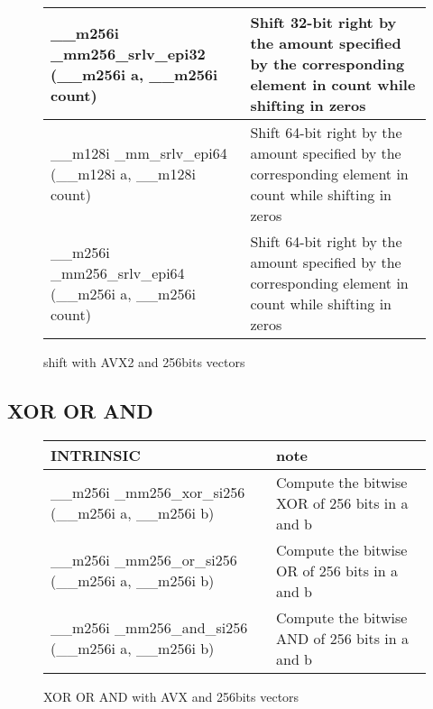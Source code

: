 \documentclass{article}
\begin{document}
\begin{figure}[h!]
\begin{tabular}{|l|l|}
\hline
\_\_m256i \_mm256\_srlv\_epi32 (\_\_m256i a, \_\_m256i count) & Shift 32-bit right by the amount specified by the corresponding element in count while shifting in zeros \\
\hline
\_\_m128i \_mm\_srlv\_epi64 (\_\_m128i a, \_\_m128i count) & Shift 64-bit right by the amount specified by the corresponding element in count while shifting in zeros\\
\hline
\_\_m256i \_mm256\_srlv\_epi64 (\_\_m256i a, \_\_m256i count) & Shift 64-bit right by the amount specified by the corresponding element in count while shifting in zeros \\
\hline
\end{tabular}
\caption{shift with AVX2 and 256bits vectors}
\label{fig:shift AVX2 256bits instructions}
\end{figure}

\newpage
\subsection{XOR OR AND}
\vspace{1cm}
\begin{figure}[h!]
\noindent
\noindent\begin{tabular}{|l|l|}
  \hline
  INTRINSIC & note \\
  \hline
  \_\_m256i \_mm256\_xor\_si256 (\_\_m256i a, \_\_m256i b) & Compute the bitwise XOR of 256 bits in a and b \\
  \_\_m256i \_mm256\_or\_si256 (\_\_m256i a, \_\_m256i b) & Compute the bitwise OR of 256 bits in a and b\\
    \hline
    \_\_m256i \_mm256\_and\_si256 (\_\_m256i a, \_\_m256i b) & Compute the bitwise AND of 256 bits in a and b\\
    \hline
\end{tabular}
\caption{XOR OR AND with AVX and 256bits vectors}
\label{fig:XOR OR AND AVX2 256bits instructions}
\end{figure}
\end{document}
